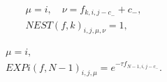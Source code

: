 \begin{equation}
     \begin{gathered}
         \mu=i,\quad \nu=f_{k,i,j-c_-}+c_-,\\
         NEST(f,k)_{i,j,\mu,\nu} = 1,
     \end{gathered}
\end{equation}

\begin{equation}
     \begin{gathered}
         \mu=i,\\
         EXPi(f,N-1)_{i,j,\mu} = e^{-\tau f_{N-1,i,j-c_-}}.
     \end{gathered}
\end{equation}